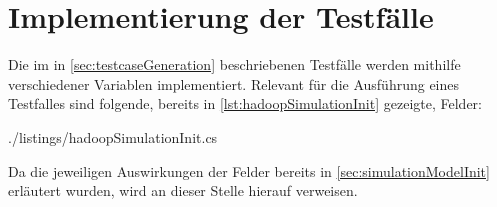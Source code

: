 \section{Implementierung der Testfälle}
\label{sec:implTestcases}

Die im in \autoref{sec:testcaseGeneration} beschriebenen Testfälle werden mithilfe verschiedener Variablen implementiert.
Relevant für die Ausführung eines Testfalles sind folgende, bereits in \autoref{lst:hadoopSimulationInit} gezeigte, Felder:


{./listings/hadoopSimulationInit.cs}

Da die jeweiligen Auswirkungen der Felder bereits in \autoref{sec:simulationModelInit} erläutert wurden, wird an dieser Stelle hierauf verweisen.
